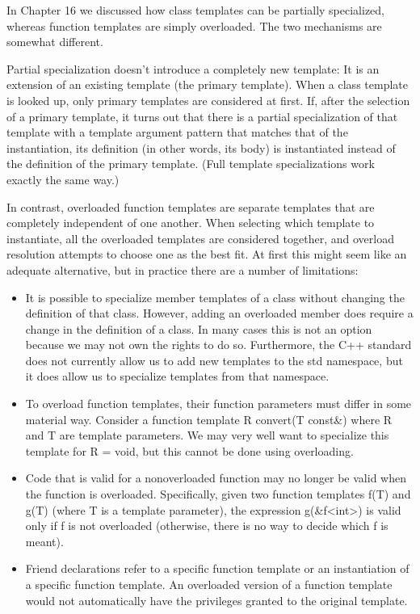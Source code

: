 
In Chapter 16 we discussed how class templates can be partially specialized, whereas function templates are simply overloaded. The two mechanisms are somewhat different.

Partial specialization doesn’t introduce a completely new template: It is an extension of an existing template (the primary template). When a class template is looked up, only primary templates are considered at first. If, after the selection of a primary template, it turns out that there is a partial specialization of that template with a template argument pattern that matches that of the instantiation, its definition (in other words, its body) is instantiated instead of the definition of the primary template. (Full template specializations work exactly the same way.)

In contrast, overloaded function templates are separate templates that are completely independent of one another. When selecting which template to instantiate, all the overloaded templates are considered together, and overload resolution attempts to choose one as the best fit. At first this might seem like an adequate alternative, but in practice there are a number of limitations:

\begin{itemize}
\item 
It is possible to specialize member templates of a class without changing the definition of that class. However, adding an overloaded member does require a change in the definition of a class. In many cases this is not an option because we may not own the rights to do so. Furthermore, the C++ standard does not currently allow us to add new templates to the std namespace, but it does allow us to specialize templates from that namespace.

\item 
To overload function templates, their function parameters must differ in some material way. Consider a function template R convert(T const\&) where R and T are template parameters. We may very well want to specialize this template for R = void, but this cannot be done using overloading.

\item 
Code that is valid for a nonoverloaded function may no longer be valid when the function is overloaded. Specifically, given two function templates f(T) and g(T) (where T is a template parameter), the expression g(\&f<int>) is valid only if f is not overloaded (otherwise, there is no way to decide which f is meant).

\item 
Friend declarations refer to a specific function template or an instantiation of a specific function template. An overloaded version of a function template would not automatically have the privileges granted to the original template.
\end{itemize}

